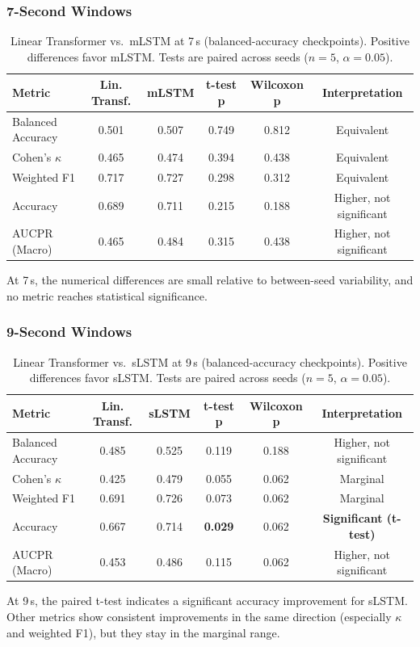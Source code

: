 \subsubsection{7-Second Windows}

\begin{table}[htbp]
\centering
\caption{Linear Transformer vs.\ \ac{mLSTM} at 7\,s (balanced-accuracy checkpoints). Positive differences favor \ac{mLSTM}. Tests are paired across seeds ($n=5$, $\alpha=0.05$).}
\label{tab:statistical_significance_7s}
\footnotesize
\begin{tabular}{l | c | c | c | c | c}
		\textbf{Metric} & \textbf{Lin. Transf.} & \textbf{\ac{mLSTM}} & \textbf{t-test p} & \textbf{Wilcoxon p} & \textbf{Interpretation} \\
\hline
Balanced Accuracy  & 0.501 & 0.507 & 0.749 & 0.812 & Equivalent \\
Cohen's $\kappa$    & 0.465 & 0.474 & 0.394 & 0.438 & Equivalent \\
Weighted F1         & 0.717 & 0.727 & 0.298 & 0.312 & Equivalent \\
Accuracy            & 0.689 & 0.711 & 0.215 & 0.188 & Higher, not significant \\
AUCPR (Macro)       & 0.465 & 0.484 & 0.315 & 0.438 & Higher, not significant \\
\hline
\end{tabular}
\end{table}

At 7\,s, the numerical differences are small relative to between-seed variability, and no metric reaches statistical significance.

\subsubsection{9-Second Windows}

\begin{table}[htbp]
\centering
\caption{Linear Transformer vs.\ \ac{sLSTM} at 9\,s (balanced-accuracy checkpoints). Positive differences favor \ac{sLSTM}. Tests are paired across seeds ($n=5$, $\alpha=0.05$).}
\label{tab:statistical_significance_9s}
\footnotesize
\begin{tabular}{l | c | c | c | c | c}
		\textbf{Metric} & \textbf{Lin. Transf.} & \textbf{\ac{sLSTM}} & \textbf{t-test p} & \textbf{Wilcoxon p} & \textbf{Interpretation} \\
\hline
Balanced Accuracy  & 0.485 & 0.525 & 0.119 & 0.188 & Higher, not significant \\
Cohen's $\kappa$    & 0.425 & 0.479 & 0.055 & 0.062 & Marginal \\
Weighted F1         & 0.691 & 0.726 & 0.073 & 0.062 & Marginal \\
Accuracy            & 0.667 & 0.714 & \textbf{0.029} & 0.062 & \textbf{Significant (t-test)} \\
AUCPR (Macro)       & 0.453 & 0.486 & 0.115 & 0.062 & Higher, not significant \\
\hline
\end{tabular}
\end{table}

At 9\,s, the paired t-test indicates a significant accuracy improvement for \ac{sLSTM}. Other metrics show consistent improvements in the same direction (especially $\kappa$ and weighted F1), but they stay in the marginal range.
